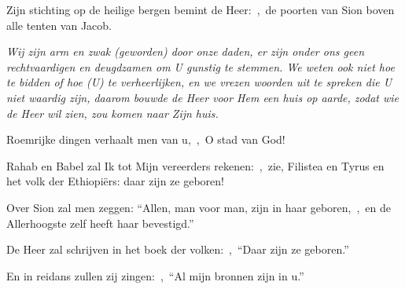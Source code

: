 \documentclass[12pt,twoside,a5paper]{article}
\begin{document}



\begin{halfparskip}
  Zijn stichting op de heilige bergen bemint de Heer:~\sep\ de poorten van Sion boven alle tenten van Jacob.


   \emph{Wij zijn arm en zwak (geworden) door onze daden, er zijn onder ons geen rechtvaardigen en deugdzamen om U gunstig te stemmen. We weten ook niet hoe te bidden of hoe (U) te verheerlijken, en we vrezen woorden uit te spreken die U niet waardig zijn, daarom bouwde de Heer voor Hem een huis op aarde, zodat wie de Heer wil zien, zou komen naar Zijn huis.}

  Roemrijke dingen verhaalt men van u,~\sep\ O stad van God!

  Rahab en Babel zal Ik tot Mijn vereerders rekenen:~\sep\ zie, Filistea en Tyrus en het volk der Ethiopiërs: daar zijn ze geboren!

  Over Sion zal men zeggen: ``Allen, man voor man, zijn in haar geboren,~\sep\ en de Allerhoogste zelf heeft haar bevestigd.''

  De Heer zal schrijven in het boek der volken:~\sep\ ``Daar zijn ze geboren.''

  En in reidans zullen zij zingen:~\sep\ ``Al mijn bronnen zijn in u.''
\end{halfparskip}


\end{document}
